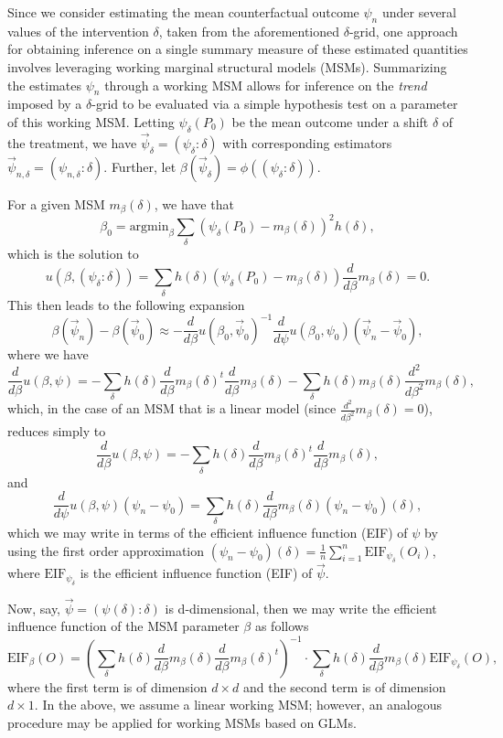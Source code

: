 \documentclass[12pt, krantz2,]{krantz}
\theoremstyle{definition}
\theoremstyle{definition}
\theoremstyle{definition}
\newcommand{\1}{\mathbbm{1}}
\begin{document}
Since we consider estimating the mean counterfactual outcome \(\psi_n\) under
several values of the intervention \(\delta\), taken from the aforementioned
\(\delta\)-grid, one approach for obtaining inference on a single summary measure
of these estimated quantities involves leveraging working marginal structural
models (MSMs). Summarizing the estimates \(\psi_n\) through a working MSM allows
for inference on the \emph{trend} imposed by a \(\delta\)-grid to be evaluated via a
simple hypothesis test on a parameter of this working MSM. Letting
\(\psi_{\delta}(P_0)\) be the mean outcome under a shift \(\delta\) of the
treatment, we have \(\vec{\psi}_{\delta} = (\psi_{\delta}: \delta)\) with
corresponding estimators \(\vec{\psi}_{n, \delta} = (\psi_{n, \delta}: \delta)\).
Further, let \(\beta(\vec{\psi}_{\delta}) = \phi((\psi_{\delta}: \delta))\).

For a given MSM \(m_{\beta}(\delta)\), we have that
\[\beta_0 = \text{argmin}_{\beta} \sum_{\delta}(\psi_{\delta}(P_0) -
m_{\beta}(\delta))^2 h(\delta),\]
which is the solution to
\[u(\beta, (\psi_{\delta}: \delta)) = \sum_{\delta}h(\delta)
\left(\psi_{\delta}(P_0) - m_{\beta}(\delta) \right) \frac{d}{d\beta}
m_{\beta}(\delta) = 0.\]
This then leads to the following expansion
\[\beta(\vec{\psi}_n) - \beta(\vec{\psi}_0) \approx -\frac{d}{d\beta}
  u(\beta_0, \vec{\psi}_0)^{-1} \frac{d}{d\psi} u(\beta_0, \psi_0)
  (\vec{\psi}_n - \vec{\psi}_0),\]
where we have
\[\frac{d}{d\beta} u(\beta, \psi) = -\sum_{\delta} h(\delta) \frac{d}{d\beta}
m_{\beta}(\delta)^t \frac{d}{d\beta} m_{\beta}(\delta)
-\sum_{\delta} h(\delta) m_{\beta}(\delta) \frac{d^2}{d\beta^2}
m_{\beta}(\delta),\]
which, in the case of an MSM that is a linear model (since
\(\frac{d^2}{d\beta^2} m_{\beta}(\delta) = 0\)), reduces simply to
\[\frac{d}{d\beta} u(\beta, \psi) = -\sum_{\delta} h(\delta) \frac{d}{d\beta}
m_{\beta}(\delta)^t \frac{d}{d\beta} m_{\beta}(\delta),\]
and
\[\frac{d}{d\psi}u(\beta, \psi)(\psi_n - \psi_0) = \sum_{\delta} h(\delta)
\frac{d}{d\beta} m_{\beta}(\delta) (\psi_n - \psi_0)(\delta),\]
which we may write in terms of the efficient influence function (EIF) of \(\psi\)
by using the first order approximation \((\psi_n - \psi_0)(\delta) = \frac{1}{n}\sum_{i = 1}^n \text{EIF}_{\psi_{\delta}}(O_i)\),
where \(\text{EIF}_{\psi_{\delta}}\) is the efficient influence function (EIF) of
\(\vec{\psi}\).

Now, say, \(\vec{\psi} = (\psi(\delta): \delta)\) is d-dimensional, then we may
write the efficient influence function of the MSM parameter \(\beta\) as follows
\[\text{EIF}_{\beta}(O) = \left(\sum_{\delta} h(\delta) \frac{d}{d\beta}
m_{\beta}(\delta) \frac{d}{d\beta} m_{\beta}(\delta)^t \right)^{-1} \cdot
\sum_{\delta} h(\delta) \frac{d}{d\beta} m_{\beta}(\delta)
\text{EIF}_{\psi_{\delta}}(O),\] where the first term is of dimension
\(d \times d\) and the second term is of dimension \(d \times 1\). In the above, we
assume a linear working MSM; however, an analogous procedure may be applied for
working MSMs based on GLMs.
\end{document}

